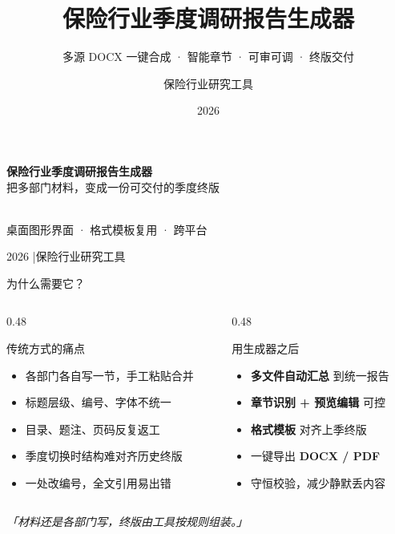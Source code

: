 \documentclass[aspectratio=169,10pt,UTF8]{ctexbeamer}
\title{\textbf{保险行业季度调研报告生成器}}
\subtitle{多源 DOCX 一键合成 · 智能章节 · 可审可调 · 终版交付}
\author{保险行业研究工具}
\institute{桌面端 · Windows / macOS}
\date{2026}
\begin{document}
\begin{frame}[plain]
  \vfill
  \begin{center}
    {\color{BrandBlue}\Huge\bfseries 保险行业季度调研报告生成器}\\[0.6em]
    {\Large 把多部门材料，变成一份可交付的季度终版}\\[1.2em]
    \\[1.4em]
    {\normalsize 桌面图形界面 · 格式模板复用 · 跨平台}
  \end{center}
  \vfill
  \begin{flushright}
    \small 2026 \quad|\quad 保险行业研究工具
  \end{flushright}
\end{frame}

\begin{frame}{为什么需要它？}
  \begin{columns}[T]
    \begin{column}{0.48\textwidth}
      \begin{block}{传统方式的痛点}
        \begin{itemize}
          \item 各部门各自写一节，手工粘贴合并
          \item 标题层级、编号、字体不统一
          \item 目录、题注、页码反复返工
          \item 季度切换时结构难对齐历史终版
          \item 一处改编号，全文引用易出错
        \end{itemize}
      \end{block}
    \end{column}
    \begin{column}{0.48\textwidth}
      \begin{exampleblock}{用生成器之后}
        \begin{itemize}
          \item \textbf{多文件自动汇总} 到统一报告
          \item \textbf{章节识别 + 预览编辑} 可控
          \item \textbf{格式模板} 对齐上季终版
          \item 一键导出 \textbf{DOCX / PDF}
          \item 守恒校验，减少静默丢内容
        \end{itemize}
      \end{exampleblock}
    \end{column}
  \end{columns}
  \vspace{0.8em}
  \centering
  \textit{「材料还是各部门写，终版由工具按规则组装。」}
\end{frame}
\end{document}

